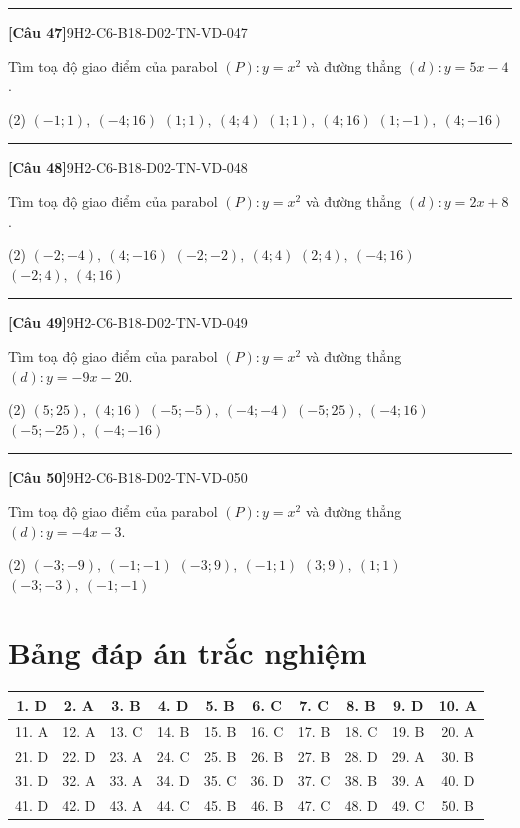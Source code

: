 \documentclass[12pt,a4paper]{article}
\newif\ifloigiai
\newenvironment{cauhoi}[2]{%
  \par\medskip\noindent\rule{\textwidth}{0.4pt}\par\nopagebreak
  \noindent\textbf{[#1]}\hfill{\scriptsize\ttfamily #2}\par\nopagebreak\smallskip}{\par}
\newcommand{\dapan}[1]{\ifloigiai\par\smallskip\noindent\textit{Đáp án:} \textbf{#1}\par\fi}
\begin{document}
\begin{cauhoi}{Câu 47}{9H2-C6-B18-D02-TN-VD-047}
Tìm toạ độ giao điểm của parabol $(P): y=x^{2}$ và đường thẳng $(d): y=5x-4$.
\begin{tasks}(2)
\task $(-1;1),\ (-4;16)$
\task $(1;1),\ (4;4)$
\task $(1;1),\ (4;16)$
\task $(1;-1),\ (4;-16)$
\end{tasks}
\dapan{C}
\end{cauhoi}
\begin{cauhoi}{Câu 48}{9H2-C6-B18-D02-TN-VD-048}
Tìm toạ độ giao điểm của parabol $(P): y=x^{2}$ và đường thẳng $(d): y=2x+8$.
\begin{tasks}(2)
\task $(-2;-4),\ (4;-16)$
\task $(-2;-2),\ (4;4)$
\task $(2;4),\ (-4;16)$
\task $(-2;4),\ (4;16)$
\end{tasks}
\dapan{D}
\end{cauhoi}
\begin{cauhoi}{Câu 49}{9H2-C6-B18-D02-TN-VD-049}
Tìm toạ độ giao điểm của parabol $(P): y=x^{2}$ và đường thẳng $(d): y=-9x-20$.
\begin{tasks}(2)
\task $(5;25),\ (4;16)$
\task $(-5;-5),\ (-4;-4)$
\task $(-5;25),\ (-4;16)$
\task $(-5;-25),\ (-4;-16)$
\end{tasks}
\dapan{C}
\end{cauhoi}
\begin{cauhoi}{Câu 50}{9H2-C6-B18-D02-TN-VD-050}
Tìm toạ độ giao điểm của parabol $(P): y=x^{2}$ và đường thẳng $(d): y=-4x-3$.
\begin{tasks}(2)
\task $(-3;-9),\ (-1;-1)$
\task $(-3;9),\ (-1;1)$
\task $(3;9),\ (1;1)$
\task $(-3;-3),\ (-1;-1)$
\end{tasks}
\dapan{B}
\end{cauhoi}
\clearpage\section*{Bảng đáp án trắc nghiệm}
\begin{center}\begin{tabular}{|c|c|c|c|c|c|c|c|c|c|}
\hline
1. D & 2. A & 3. B & 4. D & 5. B & 6. C & 7. C & 8. B & 9. D & 10. A\\\hline
11. A & 12. A & 13. C & 14. B & 15. B & 16. C & 17. B & 18. C & 19. B & 20. A\\\hline
21. D & 22. D & 23. A & 24. C & 25. B & 26. B & 27. B & 28. D & 29. A & 30. B\\\hline
31. D & 32. A & 33. A & 34. D & 35. C & 36. D & 37. C & 38. B & 39. A & 40. D\\\hline
41. D & 42. D & 43. A & 44. C & 45. B & 46. B & 47. C & 48. D & 49. C & 50. B\\\hline
\end{tabular}\end{center}
\end{document}

